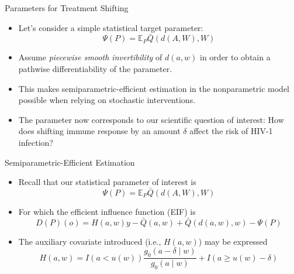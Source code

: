 \documentclass[12pt,t,handout]{beamer}
\newcommand{\E}{\mathbb{E}}
\begin{document}
\begin{frame}[c]{Parameters for Treatment Shifting}

\begin{center}
\begin{itemize}
  \itemsep10pt
  \item Let's consider a simple statistical target parameter:
    \[
      \Psi(P) = \E_P{\bar{Q}(d(A, W), W)}
    \]
  \item Assume \textit{piecewise smooth invertibility} of $d(a,w)$ in order to
    obtain a pathwise differentiability of the parameter.
  \item This makes semiparametric-efficient estimation in the nonparametric
    model possible when relying on stochastic interventions.
  \item The parameter now corresponds to our scientific question of interest:
    How does shifting immune response by an amount $\delta$ affect the risk of
    HIV-1 infection?
\end{itemize}
\end{center}


\end{frame}


\begin{frame}[c]{Semiparametric-Efficient Estimation}

\begin{center}
\begin{itemize}
  \itemsep10pt
  \item Recall that our statistical parameter of interest is
    \[
      \Psi(P) = \E_P{\bar{Q}(d(A, W), W)}
    \]
  \item For which the efficient influence function (EIF) is
    \[
      D(P)(o) = H(a, w){y - \bar{Q}(a, w)} + \bar{Q}(d(a, w), w) - \Psi(P)
    \]
  \item The auxiliary covariate introduced (i.e., $H(a,w)$) may be expressed
    \[
      H(a,w) = I(a < u(w)) \frac{g_0(a - \delta \mid w)}{g_0(a \mid w)} + I(a
      \geq u(w) - \delta)
    \]
\end{itemize}
\end{center}


\end{frame}
\end{document}
